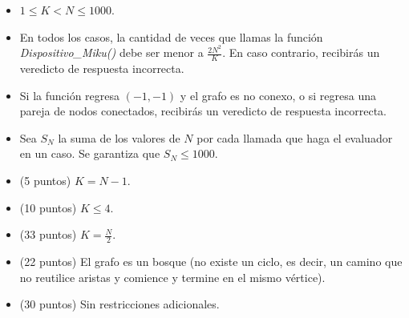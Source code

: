 \documentclass[12pt]{scrartcl}
\begin{document}
        \begin{itemize}
            \item $1 \le K < N \le 1000$.
            \item En todos los casos, la cantidad de veces que llamas la función \textit{Dispositivo\_Miku()} debe ser menor a $\frac{2N^2}{K}$. En caso contrario, recibirás un veredicto de respuesta incorrecta.
            \item Si la función regresa $(-1, -1)$ y el grafo es no conexo, o si regresa una pareja de nodos conectados, recibirás un veredicto de respuesta incorrecta.
            \item Sea $S_N$ la suma de los valores de $N$ por cada llamada que haga el evaluador en un caso. Se garantiza que $S_N \le 1000$.
        \end{itemize}
    

    \begin{itemize}
        \item (5 puntos) $K = N - 1$.
        \item (10 puntos) $K \le 4$.
        \item (33 puntos) $K = \frac{N}{2}$.
        \item (22 puntos) El grafo es un bosque (no existe un ciclo, es decir, un camino que no reutilice aristas y comience y termine en el mismo vértice).
        \item (30 puntos) Sin restricciones adicionales.
    \end{itemize}
\end{document}

